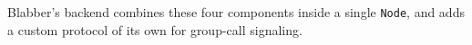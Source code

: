 \documentclass{article} %
\begin{document}
Blabber's backend combines these four
components inside a single \texttt{Node}, and
adds a custom protocol of its own for group-call signaling.
\end{document}
